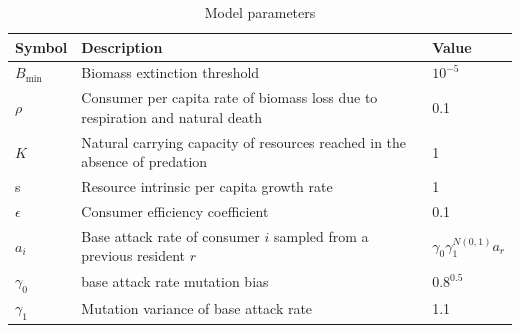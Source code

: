 \documentclass[a4paper]{report}
\begin{document}
\begin{table}[H]
  \caption{Model parameters}\label{tab:parameters}
\begin{tabular}{lll}
Symbol     & Description                                                                                                                                                                                                                      & Value                          \\
\hline
$B_{\text{min}}$  & Biomass extinction threshold                                                                                                                                                    & $10^{-5}$                            \\
\hline
$\rho$     & Consumer per capita rate of biomass loss due to respiration and natural death                                                                                                                                                   & 0.1                            \\
\hline
$K$        & Natural carrying capacity of resources reached in the absence of predation                                                                                                                                                      & 1                              \\
\hline
s          & Resource intrinsic per capita growth rate                                                                                                                                                                                       & 1                              \\
\hline
$\epsilon$ & Consumer efficiency coefficient                                                                                      & 0.1                            \\
\hline
$a_i$     & Base attack rate of consumer $i$ sampled from a previous resident $r$                                                                                                                                                               & $\gamma_0 \gamma_1^{N(0,1)} a_r$ \\
\hline
$\gamma_0$ & base attack rate mutation bias                                                                                              & $0.8^{0.5}$       \\
\hline
$\gamma_1$ & Mutation variance of base attack rate                                                                                                                                                                                           & 1.1                            \\

\end{tabular}
\end{table}
\end{document}
